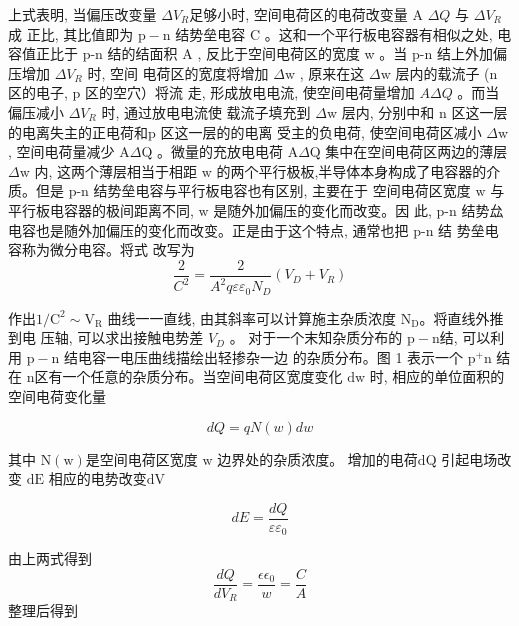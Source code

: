 \documentclass{buaaemp}
\begin{document}
上式表明, 当偏压改变量  $\Delta V_{R}  $足够小时, 空间电荷区的电荷改变量  A $\Delta Q $ 与  $\Delta V_{R}$  成 正比, 其比值即为 $ \mathrm{p}-\mathrm{n} $ 结势垒电容  $\mathrm{C} $ 。这和一个平行板电容器有相似之处, 电容值正比于  p-n  结的结面积  A , 反比于空间电荷区的宽度  w  。当  p-n  结上外加偏压增加  $\Delta V_{R}$  时, 空间 电荷区的宽度将增加  $\Delta \mathrm{w}$ , 原来在这  $\Delta \mathrm{w}$  层内的载流子  ($\mathrm{n}$  区的电子,  $\mathrm{p} $ 区的空穴）将流 走, 形成放电电流, 使空间电荷量增加 $ A \Delta Q$  。而当偏压减小  $\Delta V_{R} $ 时, 通过放电电流使 载流子填充到 $ \Delta \mathrm{w}$  层内, 分别中和  $\mathrm{n}$  区这一层的电离失主的正电荷和$  \mathrm{p}$  区这一层的的电离 受主的负电荷, 使空间电荷区减小 $ \Delta \mathrm{w} $, 空间电荷量减少  $\mathrm{A} \Delta \mathrm{Q}$  。微量的充放电电荷  $\mathrm{A} \Delta \mathrm{Q}$  集中在空间电荷区两边的薄层 $ \Delta \mathrm{w}$  内, 这两个薄层相当于相距  $\mathrm{w} $ 的两个平行极板,半导体本身构成了电容器的介质。但是 p-n 结势垒电容与平行板电容也有区别, 主要在于 空间电荷区宽度 $ \mathrm{w}$  与平行板电容器的极间距离不同,  $\mathrm{w} $ 是随外加偏压的变化而改变。因 此, p-n 结势厽电容也是随外加偏压的变化而改变。正是由于这个特点, 通常也把 p-n 结 势垒电容称为微分电容。将式  改写为
\begin{equation*}
    \frac{2}{C^{2}}=\frac{2}{A^{2} q \varepsilon \varepsilon_{0} N_{D}}\left(V_{D}+V_{R}\right)
\end{equation*}


作出$  1 / \mathrm{C}^{2} \sim \mathrm{V}_{\mathrm{R}} $ 曲线一一直线, 由其斜率可以计算施主杂质浓度 $ \mathrm{N}_{\mathrm{D}}  $。将直线外推到电 压轴, 可以求出接触电势差 $ V_{D}$  。
对于一个末知杂质分布的  $\mathrm{p}-\mathrm{n}  $结, 可以利用  $\mathrm{p}-\mathrm{n} $ 结电容一电压曲线描绘出轻掺杂一边 的杂质分布。图 1 表示一个  $\mathrm{p}^{+} \mathrm{n}$  结在  $\mathrm{n}  $区有一个任意的杂质分布。当空间电荷区宽度变化  $\mathrm{dw} $ 时, 相应的单位面积的空间电荷变化量

$$d Q=q N(w) d w$$

其中  $\mathrm{N}(\mathrm{w})  $是空间电荷区宽度 $ \mathrm{w}$  边界处的杂质浓度。
增加的电荷$  \mathrm{dQ}$  引起电场改变  $\mathrm{dE} $
相应的电势改变$  \mathrm{dV}$ 

\begin{equation*}
    d E=\frac{d Q}{\varepsilon \varepsilon_{0}}
\end{equation*}

由上两式得到
\begin{equation}
    \frac{dQ}{dV_{R}}=\frac{\epsilon \epsilon_0}{w}=\frac{C}{A} \label{equ1}
\end{equation}
 整理后得到
\end{document}
